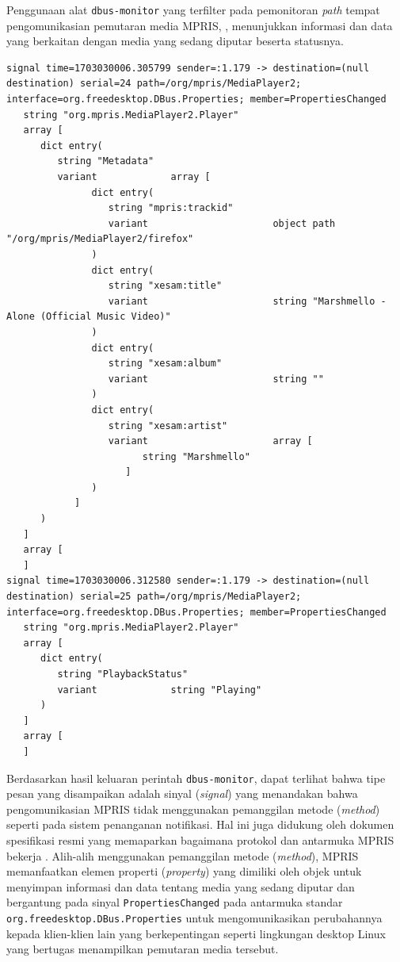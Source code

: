 Penggunaan alat \verb|dbus-monitor| yang terfilter pada pemonitoran \textit{path} tempat pengomunikasian pemutaran media MPRIS, , menunjukkan informasi dan data yang berkaitan dengan media yang sedang diputar beserta statusnya.
\begin{lstlisting}
signal time=1703030006.305799 sender=:1.179 -> destination=(null destination) serial=24 path=/org/mpris/MediaPlayer2; interface=org.freedesktop.DBus.Properties; member=PropertiesChanged
   string "org.mpris.MediaPlayer2.Player"
   array [
      dict entry(
         string "Metadata"
         variant             array [
               dict entry(
                  string "mpris:trackid"
                  variant                      object path "/org/mpris/MediaPlayer2/firefox"
               )
               dict entry(
                  string "xesam:title"
                  variant                      string "Marshmello - Alone (Official Music Video)"
               )
               dict entry(
                  string "xesam:album"
                  variant                      string ""
               )
               dict entry(
                  string "xesam:artist"
                  variant                      array [
                        string "Marshmello"
                     ]
               )
            ]
      )
   ]
   array [
   ]
signal time=1703030006.312580 sender=:1.179 -> destination=(null destination) serial=25 path=/org/mpris/MediaPlayer2; interface=org.freedesktop.DBus.Properties; member=PropertiesChanged
   string "org.mpris.MediaPlayer2.Player"
   array [
      dict entry(
         string "PlaybackStatus"
         variant             string "Playing"
      )
   ]
   array [
   ]
\end{lstlisting}

Berdasarkan hasil keluaran perintah \verb|dbus-monitor|, dapat terlihat bahwa tipe pesan yang disampaikan adalah sinyal (\textit{signal}) yang menandakan bahwa pengomunikasian MPRIS tidak menggunakan pemanggilan metode (\textit{method}) seperti pada sistem penanganan notifikasi. Hal ini juga didukung oleh dokumen spesifikasi resmi yang memaparkan bagaimana protokol dan antarmuka MPRIS bekerja \cite{xdg-mpris-specification}. Alih-alih menggunakan pemanggilan metode (\textit{method}), MPRIS memanfaatkan elemen properti (\textit{property}) yang dimiliki oleh objek  untuk menyimpan informasi dan data tentang media yang sedang diputar dan bergantung pada sinyal \verb|PropertiesChanged| pada antarmuka standar \verb|org.freedesktop.DBus.Properties| untuk mengomunikasikan perubahannya kepada klien-klien lain yang berkepentingan seperti lingkungan desktop Linux yang bertugas menampilkan pemutaran media tersebut.

